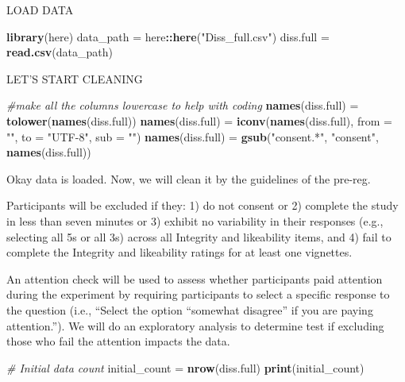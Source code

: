 \documentclass[
]{article}
\newenvironment{Shaded}{\begin{snugshade}}{\end{snugshade}}
\newcommand{\AttributeTok}[1]{\textcolor[rgb]{0.13,0.29,0.53}{#1}}
\newcommand{\CommentTok}[1]{\textcolor[rgb]{0.56,0.35,0.01}{\textit{#1}}}
\newcommand{\FunctionTok}[1]{\textcolor[rgb]{0.13,0.29,0.53}{\textbf{#1}}}
\newcommand{\NormalTok}[1]{#1}
\newcommand{\OtherTok}[1]{\textcolor[rgb]{0.56,0.35,0.01}{#1}}
\newcommand{\SpecialCharTok}[1]{\textcolor[rgb]{0.81,0.36,0.00}{\textbf{#1}}}
\newcommand{\StringTok}[1]{\textcolor[rgb]{0.31,0.60,0.02}{#1}}
\begin{document}
LOAD DATA

\begin{Shaded}
\begin{Highlighting}[]
\FunctionTok{library}\NormalTok{(here)}
\NormalTok{data\_path }\OtherTok{=}\NormalTok{ here}\SpecialCharTok{::}\FunctionTok{here}\NormalTok{(}\StringTok{"Diss\_full.csv"}\NormalTok{)}
\NormalTok{diss.full }\OtherTok{=}  \FunctionTok{read.csv}\NormalTok{(data\_path)}
\end{Highlighting}
\end{Shaded}

LET'S START CLEANING

\begin{Shaded}
\begin{Highlighting}[]
\CommentTok{\#make all the columns lowercase to help with coding }
\FunctionTok{names}\NormalTok{(diss.full) }\OtherTok{=} \FunctionTok{tolower}\NormalTok{(}\FunctionTok{names}\NormalTok{(diss.full))}
\FunctionTok{names}\NormalTok{(diss.full) }\OtherTok{=}  \FunctionTok{iconv}\NormalTok{(}\FunctionTok{names}\NormalTok{(diss.full), }\AttributeTok{from =} \StringTok{""}\NormalTok{, }\AttributeTok{to =} \StringTok{"UTF{-}8"}\NormalTok{, }\AttributeTok{sub =} \StringTok{""}\NormalTok{)}
\FunctionTok{names}\NormalTok{(diss.full) }\OtherTok{=}  \FunctionTok{gsub}\NormalTok{(}\StringTok{"consent.*"}\NormalTok{, }\StringTok{"consent"}\NormalTok{, }\FunctionTok{names}\NormalTok{(diss.full))}
\end{Highlighting}
\end{Shaded}

Okay data is loaded. Now, we will clean it by the guidelines of the
pre-reg.

Participants will be excluded if they: 1) do not consent or 2) complete
the study in less than seven minutes or 3) exhibit no variability in
their responses (e.g., selecting all 5s or all 3s) across all Integrity
and likeability items, and 4) fail to complete the Integrity and
likeability ratings for at least one vignettes.

An attention check will be used to assess whether participants paid
attention during the experiment by requiring participants to select a
specific response to the question (i.e., ``Select the option ``somewhat
disagree'' if you are paying attention.''). We will do an exploratory
analysis to determine test if excluding those who fail the attention
impacts the data.

\begin{Shaded}
\begin{Highlighting}[]
\CommentTok{\# Initial data count}
\NormalTok{initial\_count }\OtherTok{=}  \FunctionTok{nrow}\NormalTok{(diss.full)}
\FunctionTok{print}\NormalTok{(initial\_count)}
\end{Highlighting}
\end{Shaded}
\end{document}
